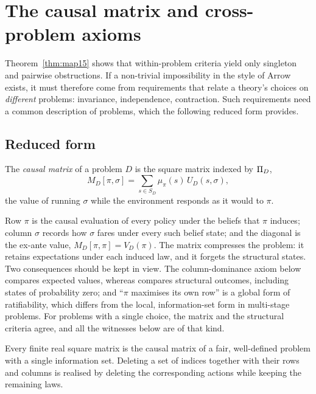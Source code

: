 \section{The causal matrix and cross-problem axioms}\label{sec:matrix}

Theorem~\ref{thm:map15} shows that within-problem criteria yield only singleton and pairwise
obstructions. If a non-trivial impossibility in the style of Arrow exists, it must therefore come
from requirements that relate a theory's choices on \emph{different} problems: invariance,
independence, contraction. Such requirements need a common description of problems, which the
following reduced form provides.

\subsection{Reduced form}

\begin{definition}\label{def:matrix}
The \emph{causal matrix} of a problem $D$ is the square matrix indexed by $\Pi_D$,
\[
  M_D[\pi,\sigma]=\sum_{s\in S_D}\mu_\pi(s)\,U_D(s,\sigma),
\]
the value of running $\sigma$ while the environment responds as it would to $\pi$.
\end{definition}

Row $\pi$ is the causal evaluation of every policy under the beliefs that $\pi$ induces; column
$\sigma$ records how $\sigma$ fares under every such belief state; and the diagonal is the ex-ante
value, $M_D[\pi,\pi]=V_D(\pi)$. The matrix compresses the problem: it retains expectations under
each induced law, and it forgets the structural states. Two consequences should be kept in view. The
column-dominance axiom below compares expected values, whereas  compares structural outcomes,
including states of probability zero; and \enquote{$\pi$ maximises its own row} is a global form of
ratifiability, which differs from the local, information-set form  in multi-stage problems.
For problems with a single choice, the matrix and the structural criteria agree, and all the
witnesses below are of that kind.

\begin{theorem}[Realisability]\label{thm:realise}
Every finite real square matrix is the causal matrix of a fair, well-defined problem with a single
information set. Deleting a set of indices together with their rows and columns is realised by
deleting the corresponding actions while keeping the remaining laws.
\end{theorem}

